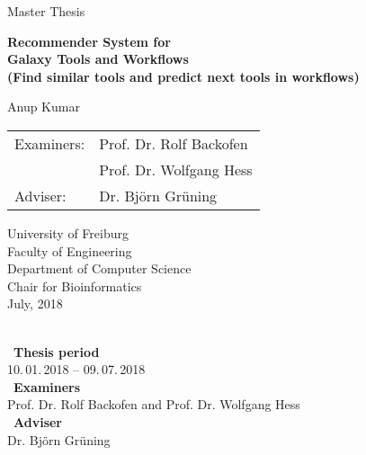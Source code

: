 \begin{titlepage}
\begin{center}

\newcommand{\HorizontalLine}{\rule{\linewidth}{0.3mm}}

{\Large Master Thesis}\\[2cm]


% 
\begin{spacing}{3}
    {\huge \bfseries Recommender System for } \\
    {\huge \bfseries Galaxy Tools and Workflows } \\
    {\Large \bfseries (Find similar tools and predict next tools in workflows) }\\[2cm]
\end{spacing}


{\Large Anup Kumar } \\[2cm]


\begin{tabular}[hc]{>{\Large}l >{\Large}l}
  Examiners: & Prof. Dr. Rolf Backofen \\[0.3cm]
             & Prof. Dr. Wolfgang Hess \\[0.3cm]
  Adviser: & Dr. Björn Grüning \\[2cm]
  
\end{tabular}
\vfill  %

\Large {
    University of Freiburg\\
    Faculty of Engineering\\
    Department of Computer Science\\
    Chair for Bioinformatics\\[0.5cm]
    July, 2018
    \\
}
\end{center}
\end{titlepage}

\ \vfill \ \\  %
\
\textbf{Thesis period}            \smallskip{} \\
10.\,01.\,2018 -- 09.\,07.\,2018   \bigskip{} \\
\
\textbf{Examiners}                 \smallskip{} \\
Prof. Dr. Rolf Backofen and Prof. Dr. Wolfgang Hess               \bigskip{} \\
\
\textbf{Adviser}                   \smallskip{} \\
Dr. Björn Grüning
